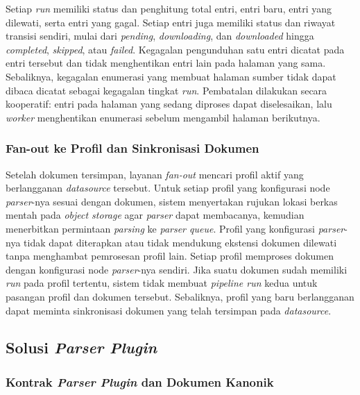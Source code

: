 Setiap \textit{run} memiliki status dan penghitung total entri, entri baru, entri yang dilewati, serta entri yang gagal.
Setiap entri juga memiliki status dan riwayat transisi sendiri, mulai dari \textit{pending}, \textit{downloading}, dan \textit{downloaded} hingga \textit{completed}, \textit{skipped}, atau \textit{failed}.
Kegagalan pengunduhan satu entri dicatat pada entri tersebut dan tidak menghentikan entri lain pada halaman yang sama.
Sebaliknya, kegagalan enumerasi yang membuat halaman sumber tidak dapat dibaca dicatat sebagai kegagalan tingkat \textit{run}.
Pembatalan dilakukan secara kooperatif: entri pada halaman yang sedang diproses dapat diselesaikan, lalu \textit{worker} menghentikan enumerasi sebelum mengambil halaman berikutnya.

\subsubsection{Fan-out ke Profil dan Sinkronisasi Dokumen}
\label{sec:solusi-fanout-profil}

Setelah dokumen tersimpan, layanan \textit{fan-out} mencari profil aktif yang berlangganan \textit{datasource} tersebut.
Untuk setiap profil yang konfigurasi node \textit{parser}-nya sesuai dengan dokumen, sistem menyertakan rujukan lokasi berkas mentah pada \textit{object storage} agar \textit{parser} dapat membacanya, kemudian menerbitkan permintaan \textit{parsing} ke \textit{parser queue}.
Profil yang konfigurasi \textit{parser}-nya tidak dapat diterapkan atau tidak mendukung ekstensi dokumen dilewati tanpa menghambat pemrosesan profil lain.
Setiap profil memproses dokumen dengan konfigurasi node \textit{parser}-nya sendiri.
Jika suatu dokumen sudah memiliki \textit{run} pada profil tertentu, sistem tidak membuat \textit{pipeline run} kedua untuk pasangan profil dan dokumen tersebut.
Sebaliknya, profil yang baru berlangganan dapat meminta sinkronisasi dokumen yang telah tersimpan pada \textit{datasource}.

\subsection{Solusi \textit{Parser Plugin}}
\label{sec:solusi-parser-plugin}

\subsubsection{Kontrak \textit{Parser Plugin} dan Dokumen Kanonik}
\label{sec:solusi-kontrak-parser}

